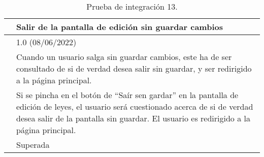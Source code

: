 \begin{table}[H]
\begin{center}
\begin{tabular}{|p{3cm}|p{10cm}|} \hline
\centering {\bf PI-13} & Salir de la pantalla de edición sin guardar cambios  \\ \hline\hline
\centering {\bf Versión} & 1.0 (08/06/2022) \\ \hline
\centering {\bf Descripción} & Cuando un usuario salga sin guardar cambios, este ha de ser consultado de si de verdad desea salir sin guardar, y ser redirigido a la página principal. \\ \hline
\centering {\bf Criterio de aceptación} & Si se pincha en el botón de ``Saír sen gardar'' en la pantalla de edición de leyes, el usuario será cuestionado acerca de si de verdad desea salir de la pantalla sin guardar. El usuario es redirigido a la página principal. \\ \hline
\centering {\bf Estado} & Superada \\ \hline
\end{tabular}
\caption{Prueba de integración 13.}
\label{enlacePI13}
\end{center}
\end{table}